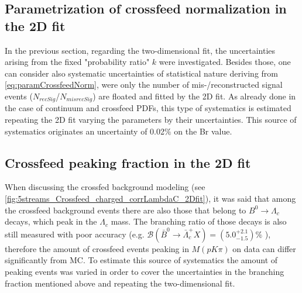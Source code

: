 \subsection{Parametrization of crossfeed normalization in the 2D fit}\label{sec:CrossBkgNormalization}

In the previous section, regarding the two-dimensional fit, the uncertainties arising from the fixed "probability ratio" $k$ were investigated. Besides those, one can consider also 
systematic uncertainties of statistical nature deriving from \cref{eq:paramCrossfeedNorm}, were only the number of mis-/reconstructed signal events ($N_{recSig}$/$N_{misrecSig}$) are floated and fitted by the 2D fit.
As already done in the case of continuum and crossfeed PDFs, this type of systematics is estimated repeating the 2D fit varying the parameters by their uncertainties.
This source of systematics originates an uncertainty of 0.02$\%$ on the Br value.


\subsection{Crossfeed peaking fraction in the 2D fit}\label{sec:PeakingCrossBkg}

When discussing the crossfed background modeling (see \cref{fig:5streams_Crossfeed_charged_corrLambdaC_2Dfit}), it was said that among the crossfeed background events 
there are also those that belong to $B^0 \rightarrow \Lambda_c$ decays, which peak in the $ \Lambda_c$ mass. The branching ratio of those decays is also still measured with poor accuracy 
(e.g. $\mathcal{B}(\bar{B}^0 \rightarrow \bar{\Lambda}_c^+ X) = (5.0^{+2.1}_{-1.5})\%$ ), therefore the amount of crossfeed events peaking in $M(p K \pi)$ on data can differ significantly from MC.
To estimate this source of systematics the amount of peaking events was varied in order to cover the uncertainties in the branching fraction mentioned above and repeating the two-dimensional fit.   

